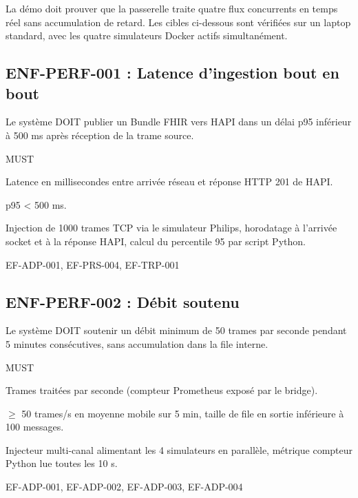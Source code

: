 La démo doit prouver que la passerelle traite quatre flux concurrents en temps réel sans accumulation de retard. Les cibles ci-dessous sont vérifiées sur un laptop standard, avec les quatre simulateurs Docker actifs simultanément.

\subsection*{ENF-PERF-001 : Latence d'ingestion bout en bout}
\begin{description}[leftmargin=2.5cm, style=nextline]
  \item[Énoncé] Le système DOIT publier un Bundle FHIR vers HAPI dans un délai p95 inférieur à 500 ms après réception de la trame source.
  \item[Priorité] MUST
  \item[Métrique] Latence en millisecondes entre arrivée réseau et réponse HTTP 201 de HAPI.
  \item[Cible] p95 < 500 ms.
  \item[Mesure] Injection de 1000 trames TCP via le simulateur Philips, horodatage à l'arrivée socket et à la réponse HAPI, calcul du percentile 95 par script Python.
  \item[Lié à] EF-ADP-001, EF-PRS-004, EF-TRP-001
\end{description}

\subsection*{ENF-PERF-002 : Débit soutenu}
\begin{description}[leftmargin=2.5cm, style=nextline]
  \item[Énoncé] Le système DOIT soutenir un débit minimum de 50 trames par seconde pendant 5 minutes consécutives, sans accumulation dans la file interne.
  \item[Priorité] MUST
  \item[Métrique] Trames traitées par seconde (compteur Prometheus exposé par le bridge).
  \item[Cible] $\geq$ 50 trames/s en moyenne mobile sur 5 min, taille de file en sortie inférieure à 100 messages.
  \item[Mesure] Injecteur multi-canal alimentant les 4 simulateurs en parallèle, métrique compteur Python lue toutes les 10 s.
  \item[Lié à] EF-ADP-001, EF-ADP-002, EF-ADP-003, EF-ADP-004
\end{description}

